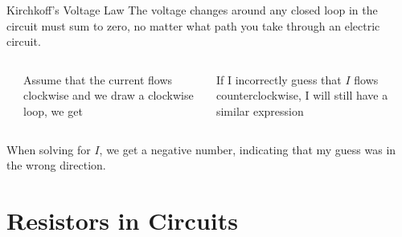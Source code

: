 \documentclass[12pt,aspectratio=169]{beamer}
\newcommand{\eq}[2]{\vspace{#1}{\Large\begin{displaymath}#2\end{displaymath}}}
\begin{document}
\begin{frame}{Kirchkoff's Voltage Law}
  The voltage changes around any closed loop in the circuit must sum to zero,
  no matter what path you take through an electric circuit.

  \vspace{.1in}
  \begin{columns}
    \begin{center}
    \end{center}
    Assume that the current flows clockwise and we draw a clockwise loop, we
    get

    \eq{-.45in}{ V-V_R=0\;\;\rightarrow\;\; V-IR=0}

    \vspace{-.25in}If I incorrectly guess that $I$ flows counterclockwise, I
    will still have a similar expression

    \eq{-.45in}{-V_R-V=0\;\;\rightarrow\;\; -V-IR=0}
  \end{columns}

  \vspace{-.1in}When solving for $I$, we get a negative number, indicating
  that my guess was in the wrong direction.
\end{frame}



\section{Resistors in Circuits}
\end{document}
